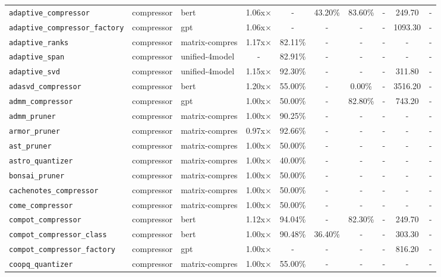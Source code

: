\begin{center}
\begin{longtable}{lllccccccr}
\texttt{adaptive\_compressor} & compressor & bert & 1.06x$\times$ & - & 43.20\% & 83.60\% & - & 249.70 & - \\
\texttt{adaptive\_compressor\_factory} & compressor & gpt & 1.06x$\times$ & - & - & - & - & 1093.30 & - \\
\texttt{adaptive\_ranks} & compressor & matrix-compres & 1.17x$\times$ & 82.11\% & - & - & - & - & - \\
\texttt{adaptive\_span} & compressor & unified-4model & - & 82.91\% & - & - & - & - & - \\
\texttt{adaptive\_svd} & compressor & unified-4model & 1.15x$\times$ & 92.30\% & - & - & - & 311.80 & - \\
\texttt{adasvd\_compressor} & compressor & bert & 1.20x$\times$ & 55.00\% & - & 0.00\% & - & 3516.20 & - \\
\texttt{admm\_compressor} & compressor & gpt & 1.00x$\times$ & 50.00\% & - & 82.80\% & - & 743.20 & - \\
\texttt{admm\_pruner} & compressor & matrix-compres & 1.00x$\times$ & 90.25\% & - & - & - & - & - \\
\texttt{armor\_pruner} & compressor & matrix-compres & 0.97x$\times$ & 92.66\% & - & - & - & - & - \\
\texttt{ast\_pruner} & compressor & matrix-compres & 1.00x$\times$ & 50.00\% & - & - & - & - & - \\
\texttt{astro\_quantizer} & compressor & matrix-compres & 1.00x$\times$ & 40.00\% & - & - & - & - & - \\
\texttt{bonsai\_pruner} & compressor & matrix-compres & 1.00x$\times$ & 50.00\% & - & - & - & - & - \\
\texttt{cachenotes\_compressor} & compressor & matrix-compres & 1.00x$\times$ & 50.00\% & - & - & - & - & - \\
\texttt{come\_compressor} & compressor & matrix-compres & 1.00x$\times$ & 50.00\% & - & - & - & - & - \\
\texttt{compot\_compressor} & compressor & bert & 1.12x$\times$ & 94.04\% & - & 82.30\% & - & 249.70 & - \\
\texttt{compot\_compressor\_class} & compressor & bert & 1.00x$\times$ & 90.48\% & 36.40\% & - & - & 303.30 & - \\
\texttt{compot\_compressor\_factory} & compressor & gpt & 1.00x$\times$ & - & - & - & - & 816.20 & - \\
\texttt{coopq\_quantizer} & compressor & matrix-compres & 1.00x$\times$ & 55.00\% & - & - & - & - & - \\

\end{longtable}
\end{center}

